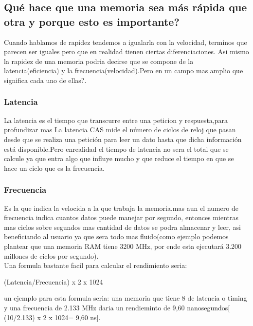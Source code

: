 \documentclass{article}
\begin{document}
    \subsection{Qué hace que una memoria sea más rápida que otra y porque esto es importante?}
    
    Cuando hablamos de rapidez tendemos a igualarla con la velocidad, terminos que parecen ser iguales pero que en realidad tienen ciertas diferenciaciones. Asi mismo la rapidez de  una memoria podria decirse que se compone de la latencia(eficiencia) y la frecuencia(velocidad).Pero en un campo mas amplio que significa cada uno de ellas?.
    
    \subsubsection{Latencia} La latencia es el tiempo que transcurre entre una peticion y respuesta,para profundizar mas La latencia CAS mide el número de ciclos de reloj que pasan desde que se realiza una petición para leer un dato hasta que dicha información está disponible.Pero enrealidad el tiempo de latencia no sera el total que se calcule ya que entra algo que influye mucho y que reduce el tiempo en que se hace un ciclo que es la frecuencia.\cite{profesional}
    
    \subsubsection{Frecuencia} Es la que indica la velocida a la que trabaja la memoria,mas aun el numero de frecuencia indica cuantos datos puede manejar por segundo, entonces mientras mas ciclos sobre segundos mas cantidad de datos se podra almacenar y leer, asi beneficiando al usuario ya que sera todo mas fluido(como ejemplo podemos plantear que una memoria RAM tiene 3200 MHz, por ende esta ejecutará 3.200 millones de ciclos por segundo).\cite{computerhoy}\\
    
    Una formula bastante facil para calcular el rendimiento  seria: 
    
    \vspace{0,5 cm}
    
    (Latencia/Frecuencia) x 2 x 1024
    
    \vspace{0,5 cm}
    
    un ejemplo para esta formula seria: una memoria que tiene 8 de latencia o timing y una frecuencia de 2.133 MHz daria un rendieminto de 9,60 nanosegundos[ (10/2.133) x 2 x 1024= 9,60 ns].\\
    
\end{document}
